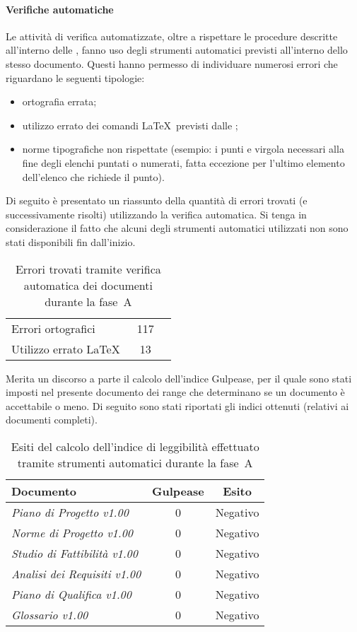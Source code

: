 \documentclass[../PianoDiQualifica.tex]{subfiles}
\begin{document}
\begin{appendices}
			\paragraph{Verifiche automatiche}
			Le attività di verifica automatizzate, oltre a rispettare le procedure descritte all'interno delle \normediprogettov, fanno uso degli strumenti automatici previsti all'interno dello stesso documento. Questi hanno permesso di individuare numerosi errori che riguardano le seguenti tipologie:
			\begin{itemize}
				\item ortografia errata;
				\item utilizzo errato dei comandi \LaTeX\ previsti dalle \normediprogettov;
				\item norme tipografiche non rispettate (esempio: i punti e virgola necessari alla fine degli elenchi puntati o numerati, fatta eccezione per l'ultimo elemento dell'elenco che richiede il punto).
			\end{itemize}
			Di seguito è presentato un riassunto della quantità di errori trovati (e successivamente risolti) utilizzando la verifica automatica. Si tenga in considerazione il fatto che alcuni degli strumenti automatici utilizzati non sono stati disponibili fin dall'inizio.
\begin{table}[H]
		\centering
		\begin{tabular}{l * {2}{c}}
			\midrule
			Errori ortografici &	117 \\
			Utilizzo errato \LaTeX\ & 13 \\
			\midrule
		\end{tabular}
		\caption{Errori trovati tramite verifica automatica dei documenti durante la fase\g\ A}
		\label{tab:errori_automatica}
\end{table}	
			Merita un discorso a parte il calcolo dell'indice Gulpease\g, per il quale sono stati imposti nel presente documento dei range che determinano se un documento è accettabile o meno. Di seguito sono stati riportati gli indici ottenuti (relativi ai documenti completi).
\begin{table}[H]
		\centering
		\begin{tabular}{l * {2}{c}}
			\toprule
			\textbf{Documento} & \textbf{Gulpease} & \textbf{Esito} \\
			\midrule
			\textit{Piano di Progetto v1.00} & 0 &  Negativo \\
			\textit{Norme di Progetto v1.00} & 0 & Negativo \\
			\textit{Studio di Fattibilità v1.00} & 0 & Negativo \\
			\textit{Analisi dei Requisiti v1.00} & 0 & Negativo \\
			\textit{Piano di Qualifica v1.00} & 0 & Negativo \\
			\textit{Glossario v1.00} & 0 & Negativo \\
			\bottomrule
		\end{tabular}
		\caption{Esiti del calcolo dell’indice di leggibilità effettuato tramite strumenti automatici durante la fase\g\ A}
		\label{tab:esiti_gulpease}
\end{table}

\end{appendices}
\end{document}
